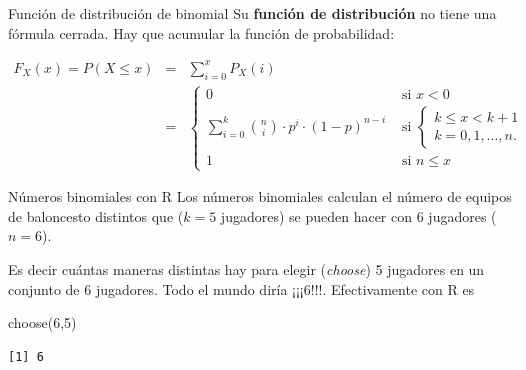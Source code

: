 \documentclass[
  ignorenonframetext,
  aspectratio=169]{beamer}
\newenvironment{Shaded}{\begin{snugshade}}{\end{snugshade}}
\newcommand{\DecValTok}[1]{\textcolor[rgb]{0.68,0.00,0.00}{#1}}
\newcommand{\FunctionTok}[1]{\textcolor[rgb]{0.28,0.35,0.67}{#1}}
\newcommand{\NormalTok}[1]{\textcolor[rgb]{0.00,0.23,0.31}{#1}}
\begin{document}
\begin{frame}{Función de distribución de binomial}
\protect\hypertarget{funciuxf3n-de-distribuciuxf3n-de-binomial}{}
Su \textbf{función de distribución} no tiene una fórmula cerrada. Hay
que acumular la función de probabilidad:

\begin{eqnarray*}
F_{X}(x)=P(X\leq x) & = & \sum_{i=0}^x P_X(i)\\
& = & 
\left\{
\begin{array}{ll}
0 & \mbox{ si } x<0\\\displaystyle
\sum_{i=0}^k {n\choose i}\cdot  p^i \cdot (1-p)^{n-i} & \mbox{ si } 
\left\{
  \begin{array}{l} 
  k\leq x< k+1\\
  k=0,1,\ldots,n.
  \end{array}
\right.\\
1 & \mbox{ si } n\leq x
\end{array}
\right.
\end{eqnarray*}
\end{frame}

\begin{frame}[fragile]{Números binomiales con R}
\protect\hypertarget{nuxfameros-binomiales-con-r}{}
Los números binomiales calculan el número de equipos de baloncesto
distintos que (\(k=5\) jugadores) se pueden hacer con 6 jugadores
(\(n=6\)).

Es decir cuántas maneras distintas hay para elegir (\emph{choose}) 5
jugadores en un conjunto de 6 jugadores. Todo el mundo diría ¡¡¡6!!!.
Efectivamente con R es

\begin{Shaded}
\begin{Highlighting}[]
\FunctionTok{choose}\NormalTok{(}\DecValTok{6}\NormalTok{,}\DecValTok{5}\NormalTok{)}
\end{Highlighting}
\end{Shaded}

\begin{verbatim}
[1] 6
\end{verbatim}
\end{frame}
\end{document}
